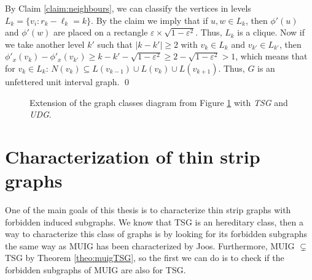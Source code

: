 {By Claim \ref{claim:neighbours}, we can classify the vertices in levels $L_k = \{v_i : r_k - \ell_k = k\}$. By the claim we imply that if $u,w \in L_k$, then $\phi'(u)$ and $\phi'(w)$ are placed on a rectangle $\varepsilon \times \sqrt{1 - \varepsilon^2}$.
Thus, $L_k$ is a clique. Now if we take another level $k'$ such that $|k - k'| \geqslant 2$ with $v_k \in L_k$ and $v_{k'} \in L_{k'}$, then $\phi'_x(v_k) - \phi'_x(v_{k'}) \geqslant k
- k' - \sqrt{1 - \varepsilon^2} \geqslant 2 - \sqrt{1 - \varepsilon^2} > 1$, which means that for $v_k \in L_k$: $N(v_k) \subseteq L(v_{k-1}) \cup L(v_{k}) \cup L(v_{k+1})$. Thus, $G$ is an unfettered unit interval graph. \qed}


\begin{figure}
\begin{center}
\begin{scaletikzpicturetowidth}{\textwidth}
\end{scaletikzpicturetowidth}
\end{center}
  \caption{Extension of the graph classes diagram from Figure \ref{fig:hierarchyTSG} with \emph{TSG} and \emph{UDG}.}
\label{fig:hierarchyTSG}
\end{figure}

\section{Characterization of thin strip graphs}

One of the main goals of this thesis is to characterize thin strip graphs with forbidden induced subgraphs. We know that TSG is an hereditary class, then a way to characterize this class of graphs is by looking for its forbidden subgraphs the same way as MUIG has been characterized by Joos. Furthermore, MUIG $\subsetneq$ TSG by Theorem \ref{theo:muigTSG}, so the first we can do is to check if the forbidden subgraphs of MUIG are also for TSG.


